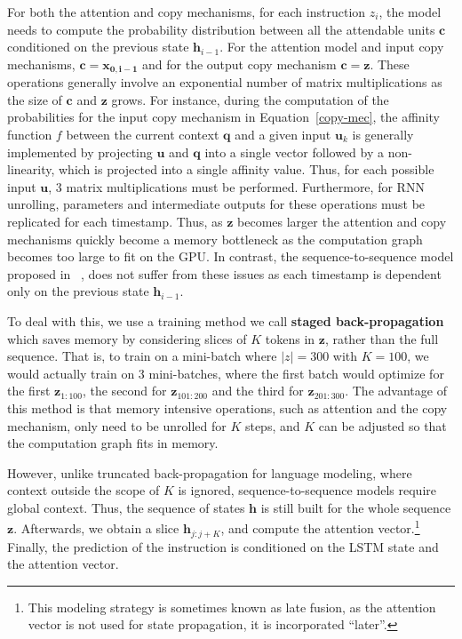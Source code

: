 For both the attention and copy mechanisms, for each instruction $z_i$, the model needs to compute the probability distribution between all the attendable units $\boldsymbol{c}$ conditioned on the previous state $\mathbf{h}_{i-1}$. For the attention model and input copy mechanisms, $\boldsymbol{c}=\boldsymbol{x_{0,i-1}}$ and for the output copy mechanism $\boldsymbol{c}=\boldsymbol{z}$. These operations generally involve an exponential number of matrix multiplications as the size of $\boldsymbol{c}$ and $\boldsymbol{z}$ grows. For instance, during the computation of the probabilities for the input copy mechanism in Equation~\ref{copy-mec}, the affinity function $f$ between the current context $\boldsymbol{q}$ and a given input $\boldsymbol{u}_k$ is generally implemented by projecting $\boldsymbol{u}$ and $\boldsymbol{q}$ into a single vector followed by a non-linearity, which is projected into a single affinity value. Thus, for each possible input $\boldsymbol{u}$, 3 matrix multiplications must be performed. Furthermore, for RNN unrolling, parameters and intermediate outputs for these operations must be replicated for each timestamp. Thus, as $\boldsymbol{z}$ becomes larger the attention and copy mechanisms quickly become a memory bottleneck as the computation graph becomes too large to fit on the GPU. In contrast, the sequence-to-sequence model proposed in ~\cite{DBLP:journals/corr/SutskeverVL14}, does not suffer from these issues as each timestamp is dependent only on the previous state $\mathbf{h}_{i-1}$.

To deal with this, we use a training method we call \textbf{staged back-propagation} which saves memory by considering slices of $K$ tokens in $\boldsymbol{z}$, rather than the full sequence. That is, to train on a mini-batch where $|z|=300$ with $K=100$, we would actually train on 3 mini-batches, where the first batch would optimize for the first $\boldsymbol{z}_{1:100}$, the second for $\boldsymbol{z}_{101:200}$ and the third for $\boldsymbol{z}_{201:300}$. The advantage of this method is that memory intensive operations, such as attention and the copy mechanism, only need to be unrolled for $K$ steps, and $K$ can be adjusted so that the computation graph fits in memory. 

However, unlike truncated back-propagation for language modeling, where context outside the scope of $K$ is ignored, sequence-to-sequence models require global context. Thus, the sequence of states $\boldsymbol{h}$ is still built for the whole sequence $\boldsymbol{z}$. Afterwards, we obtain a slice $\boldsymbol{h}_{j:j+K}$, and compute the attention vector.\footnote{This modeling strategy is sometimes known as late fusion, as the attention vector is not used for state propagation, it is incorporated ``later''.} Finally, the prediction of the instruction is conditioned on the LSTM state and the attention vector.


